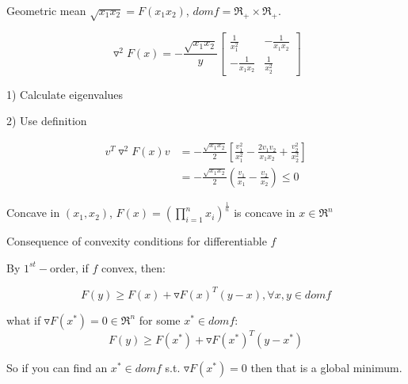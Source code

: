 \begin{example}
	Geometric mean $\sqrt{x_1x_2} = F(x_1x_2)$, $domf = \Re_+ \times \Re_+$.
	
	\begin{equation*}
	\triangledown^2F(x) = -\frac{\sqrt{x_1x_2}}{y}\begin{bmatrix}
	\frac{1}{x^2_1} & -\frac{1}{x_1x_2}\\
	-\frac{1}{x_1x_2} & \frac{1}{x^2_2}
	\end{bmatrix}
	\end{equation*}
	
	1) Calculate eigenvalues
	
	2) Use definition
	
	\begin{align*}
	v^T\triangledown^2F(x)v &= -\frac{\sqrt{x_1x_2}}{2}[\frac{v_1^2}{x_1^2} - \frac{2v_1v_2}{x_1x_2} + \frac{v_2^2}{x^2_2}]\\
	&= -\frac{\sqrt{x_1x_2}}{2}(\frac{v_1}{x_1} -\frac{v_2}{x_2}) \leq 0
	\end{align*}
	
	Concave in $(x_1, x_2)$, $F(x) = (\prod^n_{i=1}x_i)^{\frac{1}{n}}$ is concave in $x\in \Re^n$
\end{example}

Consequence of convexity conditions for differentiable $f$

By $1^{st}-$order, if $f$ convex, then:

\begin{equation*}
F(y)\geq F(x) + \triangledown F(x)^T(y-x), \forall x,y\in domf
\end{equation*}


what if $\triangledown F(x^*) = 0 \in \Re^n$ for some $x^*\in domf$:
\begin{equation*}
F(y)\geq F(x^*) + \triangledown F(x^*)^T(y-x^*)
\end{equation*}

So if you can find an $x^*\in domf$ s.t. $\triangledown F(x^*) = 0$ then that is a global minimum.


